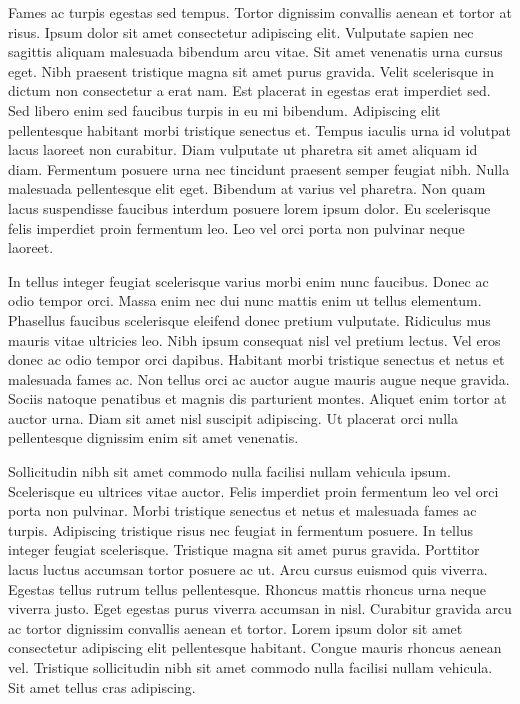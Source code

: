 \documentclass[11pt,a4paper]{article}
\begin{document}
Fames ac turpis egestas sed tempus. Tortor dignissim convallis aenean et tortor at risus. Ipsum dolor sit amet consectetur adipiscing elit. Vulputate sapien nec sagittis aliquam malesuada bibendum arcu vitae. Sit amet venenatis urna cursus eget. Nibh praesent tristique magna sit amet purus gravida. Velit scelerisque in dictum non consectetur a erat nam. Est placerat in egestas erat imperdiet sed. Sed libero enim sed faucibus turpis in eu mi bibendum. Adipiscing elit pellentesque habitant morbi tristique senectus et. Tempus iaculis urna id volutpat lacus laoreet non curabitur. Diam vulputate ut pharetra sit amet aliquam id diam. Fermentum posuere urna nec tincidunt praesent semper feugiat nibh. Nulla malesuada pellentesque elit eget. Bibendum at varius vel pharetra. Non quam lacus suspendisse faucibus interdum posuere lorem ipsum dolor. Eu scelerisque felis imperdiet proin fermentum leo. Leo vel orci porta non pulvinar neque laoreet.

In tellus integer feugiat scelerisque varius morbi enim nunc faucibus. Donec ac odio tempor orci. Massa enim nec dui nunc mattis enim ut tellus elementum. Phasellus faucibus scelerisque eleifend donec pretium vulputate. Ridiculus mus mauris vitae ultricies leo. Nibh ipsum consequat nisl vel pretium lectus. Vel eros donec ac odio tempor orci dapibus. Habitant morbi tristique senectus et netus et malesuada fames ac. Non tellus orci ac auctor augue mauris augue neque gravida. Sociis natoque penatibus et magnis dis parturient montes. Aliquet enim tortor at auctor urna. Diam sit amet nisl suscipit adipiscing. Ut placerat orci nulla pellentesque dignissim enim sit amet venenatis.

Sollicitudin nibh sit amet commodo nulla facilisi nullam vehicula ipsum. Scelerisque eu ultrices vitae auctor. Felis imperdiet proin fermentum leo vel orci porta non pulvinar. Morbi tristique senectus et netus et malesuada fames ac turpis. Adipiscing tristique risus nec feugiat in fermentum posuere. In tellus integer feugiat scelerisque. Tristique magna sit amet purus gravida. Porttitor lacus luctus accumsan tortor posuere ac ut. Arcu cursus euismod quis viverra. Egestas tellus rutrum tellus pellentesque. Rhoncus mattis rhoncus urna neque viverra justo. Eget egestas purus viverra accumsan in nisl. Curabitur gravida arcu ac tortor dignissim convallis aenean et tortor. Lorem ipsum dolor sit amet consectetur adipiscing elit pellentesque habitant. Congue mauris rhoncus aenean vel. Tristique sollicitudin nibh sit amet commodo nulla facilisi nullam vehicula. Sit amet tellus cras adipiscing.
\end{document}

